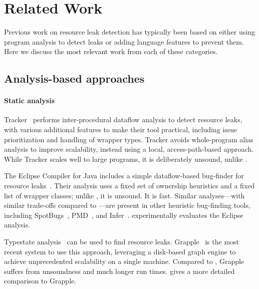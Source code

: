 \section{Related Work}
\label{sec:relatedwork}

Previous work on resource leak detection has typically been based on either
using program analysis to detect leaks or adding language features to prevent
them. Here we discuss the most relevant work from each of these categories.

\subsection{Analysis-based approaches}\label{sec:rw-analysis}


\paragraph{Static analysis}
Tracker~\cite{TorlakC10} performs inter-procedural dataflow analysis to detect
resource leaks, with various additional features to make their tool practical,
including issue prioritization and handling of wrapper types.  Tracker avoids
whole-program alias analysis to improve scalability, instead using a local,
access-path-based approach.  While Tracker scales well to large programs, it is
deliberately unsound, unlike \Tool.

The Eclipse Compiler for Java includes a simple dataflow-based
bug-finder for resource leaks~\cite{ecj-resource-leak}. Their analysis
uses a fixed set of ownership heuristics and a fixed list of wrapper
classes; unlike \Tool, it is unsound. It is fast.  Similar analyses---with similar trade-offs
compared to \Tool---are present in other heuristic bug-finding tools,
including SpotBugs~\cite{spotbugs-resource-leak},
PMD~\cite{pmd-resource-leak}, and Infer~\cite{infer-resource-leak}.
 experimentally evaluates the Eclipse analysis.

Typestate analysis~\cite{StromY86,FinkYDRG2008} can be used to
find resource leaks.  Grapple~\cite{zuo2019grapple} is the most recent system to
use this approach, leveraging a disk-based graph engine to achieve unprecedented
scalability on a single machine.  Compared to \Tool, Grapple
suffers from unsoundness and much longer run times.
 gives a more detailed comparison to Grapple.

